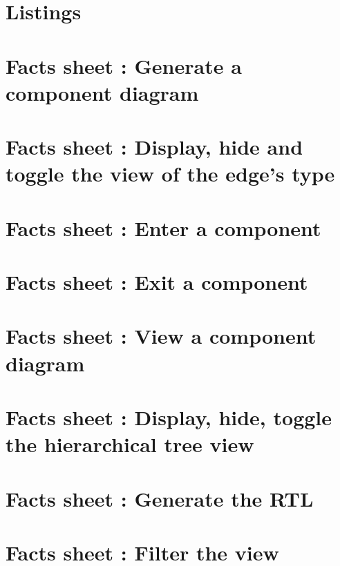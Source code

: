 \documentclass[a4paper,11pt]{report}
\begin{document}

\tableofcontents
\newpage









\printbibliography

\begin{appendices}

\chapter{Listings}
    \label{cha:appendix-lst}

\chapter{Facts sheet : Generate a component diagram}


\chapter{Facts sheet : Display, hide and toggle the view of the edge's type}


\chapter{Facts sheet : Enter a component}


\chapter{Facts sheet : Exit a component}


\chapter{Facts sheet : View a component diagram}


\chapter{Facts sheet : Display, hide, toggle the hierarchical tree view}


\chapter{Facts sheet : Generate the RTL}


\chapter{Facts sheet : Filter the view}


\end{appendices}
\end{document}
